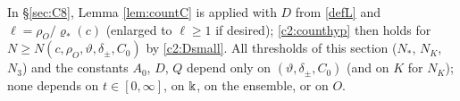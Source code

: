 \begin{auxremark}\label{c2:rem}
In \S\ref{sec:C8}, Lemma \ref{lem:countC} is applied with $D$ from \eqref{defL} and $\ell=\rho_O/\varrho_*(c)$ (enlarged to $\ell\ge1$ if desired); \eqref{c2:counthyp} then holds for $N\ge N(c,\rho_O,\vartheta,\delta_\pm,C_0)$ by \eqref{c2:Dsmall}.
All thresholds of this section ($N_*$, $N_K$, $N_3$) and the constants $A_0$, $D$, $Q$ depend only on $(\vartheta,\delta_\pm,C_0)$ (and on $K$ for $N_K$); none depends on $t\in[0,\infty]$, on $\Bbbk$, on the ensemble, or on $O$.
\end{auxremark}
